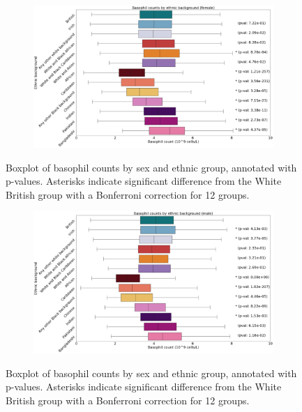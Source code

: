 \documentclass[12pt]{pnas-new}
\begin{document}

\begin{figure}
    \centering
    \begin{subfigure}{\textwidth}
    \includegraphics[width=\textwidth]{images/female_basophill_boxplot_annotated.pdf}
    \end{subfigure}
    \caption{Boxplot of basophil counts by sex and ethnic group, annotated with p-values. Asterisks indicate significant difference from the White British group with a Bonferroni correction for 12 groups.}
    \label{fig:supp_box_basophill_f}
\end{figure}

\begin{figure}
    \centering
    \begin{subfigure}{\textwidth}
    \includegraphics[width=\textwidth]{images/male_basophill_boxplot_annotated.pdf}
    \end{subfigure}
    \caption{Boxplot of basophil counts by sex and ethnic group, annotated with p-values. Asterisks indicate significant difference from the White British group with a Bonferroni correction for 12 groups.}
    \label{fig:supp_box_basophill_m}
\end{figure}
\end{document}
